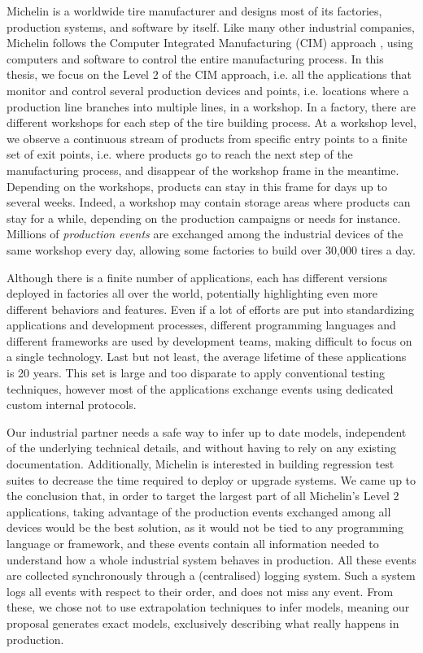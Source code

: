 Michelin is a worldwide tire manufacturer and designs most of its
factories, production systems, and software by itself.  Like
many other industrial companies, Michelin follows the Computer
Integrated Manufacturing (CIM) approach \cite{rehg2004computer},
using computers and software to control the entire manufacturing
process. In this thesis, we focus on the Level 2 of the CIM
approach, i.e. all the applications that monitor and control
several production devices and points, i.e. locations where a
production line branches into multiple lines, in a workshop. In a
factory, there are different workshops for each step of the tire
building process. At a workshop level, we observe a continuous
stream of products from specific entry points to a finite set of
exit points, i.e. where products go to reach the next step of the
manufacturing process, and disappear of the workshop frame in the
meantime. Depending on the workshops, products can stay in this
frame for days up to several weeks. Indeed, a workshop may
contain storage areas where products can stay for a while,
depending on the production campaigns or needs for instance.
Millions of \emph{production events} are exchanged among the
industrial devices of the same workshop every day, allowing some
factories to build over 30,000 tires a day.


Although there is a finite number of applications, each has
different versions deployed in factories all over the world,
potentially highlighting even more different behaviors and
features. Even if a lot of efforts are put into standardizing
applications and development processes, different programming
languages and different frameworks are used by development
teams, making difficult to focus on a single technology. Last
but not least, the average lifetime of these applications is 20
years. This set is large and too disparate to apply conventional
testing techniques, however most of the applications exchange
events using dedicated custom internal protocols.

Our industrial partner needs a safe way to infer up to date
models, independent of the underlying technical details, and
without having to rely on any existing documentation.
Additionally, Michelin is interested in building regression test
suites to decrease the time required to deploy or upgrade
systems. We came up to the conclusion that, in order to target
the largest part of all Michelin's Level 2 applications, taking
advantage of the production events exchanged among all devices
would be the best solution, as it would not be tied to any
programming language or framework, and these events contain all
information needed to understand how a whole industrial system
behaves in production. All these events are collected
synchronously through a (centralised) logging system. Such a
system logs all events with respect to their order, and does not
miss any event.  From these, we chose not to use extrapolation
techniques to infer models, meaning our proposal generates exact
models, exclusively describing what really happens in production.

